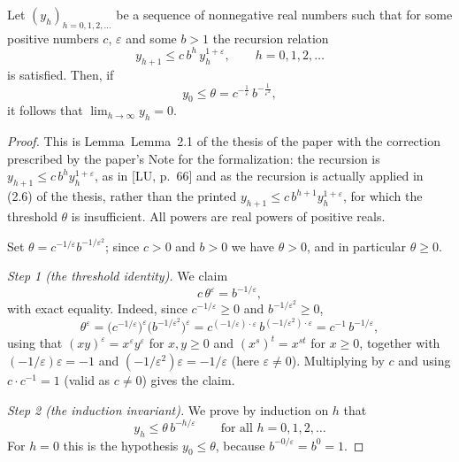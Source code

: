 \begin{lemma}[Lemma 2.1]
Let $(y_h)_{h=0,1,2,\dots}$ be a sequence of nonnegative real numbers such that
for some positive numbers $c$, $\varepsilon$ and some $b>1$ the recursion
relation
\[
y_{h+1}\le c\,b^{h}\,y_h^{1+\varepsilon},\qquad h=0,1,2,\dots
\]
is satisfied.  Then, if
\[
y_0\le\theta=c^{-\frac1\varepsilon}\,b^{-\frac1{\varepsilon^2}},
\]
it follows that $\lim_{h\to\infty}y_h=0$.
\end{lemma}
\begin{proof}
This is Lemma~Lemma~2.1 of the thesis of the paper with the correction prescribed by the
paper's Note for the formalization: the recursion is $y_{h+1}\le
c\,b^{h}y_h^{1+\varepsilon}$, as in [LU, p.~66] and as the recursion is actually
applied in (2.6) of the thesis, rather than the printed $y_{h+1}\le
c\,b^{h+1}y_h^{1+\varepsilon}$, for which the threshold $\theta$ is
insufficient.  All powers are real powers of positive reals.

Set $\theta=c^{-1/\varepsilon}b^{-1/\varepsilon^2}$; since $c>0$ and $b>0$ we
have $\theta>0$, and in particular $\theta\ge0$.

\emph{Step 1 (the threshold identity).}  We claim
\[
c\,\theta^{\varepsilon}=b^{-1/\varepsilon},
\]
with exact equality.  Indeed, since $c^{-1/\varepsilon}\ge0$ and
$b^{-1/\varepsilon^2}\ge0$,
\[
\theta^{\varepsilon}
=\bigl(c^{-1/\varepsilon}\bigr)^{\varepsilon}\bigl(b^{-1/\varepsilon^{2}}\bigr)^{\varepsilon}
=c^{(-1/\varepsilon)\cdot\varepsilon}\,b^{(-1/\varepsilon^{2})\cdot\varepsilon}
=c^{-1}\,b^{-1/\varepsilon},
\]
using that $(xy)^{\varepsilon}=x^{\varepsilon}y^{\varepsilon}$ for
$x,y\ge0$ and $(x^{s})^{t}=x^{st}$ for $x\ge0$, together with
$(-1/\varepsilon)\varepsilon=-1$ and
$(-1/\varepsilon^{2})\varepsilon=-1/\varepsilon$ (here $\varepsilon\neq0$).
Multiplying by $c$ and using $c\cdot c^{-1}=1$ (valid as $c\neq0$) gives the
claim.

\emph{Step 2 (the induction invariant).}  We prove by induction on $h$ that
\[
y_h\le\theta\,b^{-h/\varepsilon}\qquad\text{for all }h=0,1,2,\dots
\]
For $h=0$ this is the hypothesis $y_0\le\theta$, because
$b^{-0/\varepsilon}=b^{0}=1$.


\end{proof}
